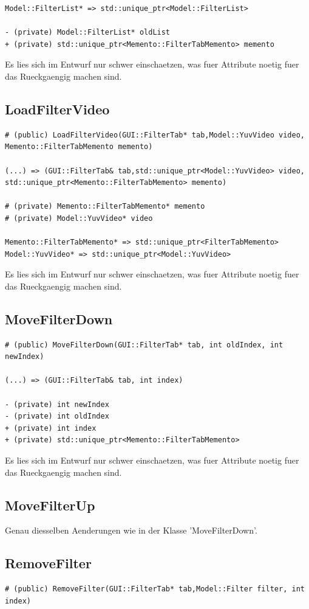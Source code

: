 \documentclass{scrartcl}
\begin{document}
{\begin{verbatim}
Model::FilterList* => std::unique_ptr<Model::FilterList>

- (private) Model::FilterList* oldList
+ (private) std::unique_ptr<Memento::FilterTabMemento> memento
\end{verbatim}
Es lies sich im Entwurf nur schwer einschaetzen, was fuer Attribute noetig fuer das Rueckgaengig machen sind.
\subsection{LoadFilterVideo}
\begin{verbatim}
# (public) LoadFilterVideo(GUI::FilterTab* tab,Model::YuvVideo video,
Memento::FilterTabMemento memento)

(...) => (GUI::FilterTab& tab,std::unique_ptr<Model::YuvVideo> video,
std::unique_ptr<Memento::FilterTabMemento> memento)

# (private) Memento::FilterTabMemento* memento
# (private) Model::YuvVideo* video

Memento::FilterTabMemento* => std::unique_ptr<FilterTabMemento>
Model::YuvVideo* => std::unique_ptr<Model::YuvVideo>
\end{verbatim}
Es lies sich im Entwurf nur schwer einschaetzen, was fuer Attribute noetig fuer das Rueckgaengig machen sind.
\subsection{MoveFilterDown}
\begin{verbatim}
# (public) MoveFilterDown(GUI::FilterTab* tab, int oldIndex, int newIndex)

(...) => (GUI::FilterTab& tab, int index)

- (private) int newIndex
- (private) int oldIndex
+ (private) int index
+ (private) std::unique_ptr<Memento::FilterTabMemento>
\end{verbatim}
Es lies sich im Entwurf nur schwer einschaetzen, was fuer Attribute noetig fuer das Rueckgaengig machen sind.
\subsection{MoveFilterUp}
Genau diesselben Aenderungen wie in der Klasse 'MoveFilterDown'.
\subsection{RemoveFilter}
\begin{verbatim}
# (public) RemoveFilter(GUI::FilterTab* tab,Model::Filter filter, int index)


\end{verbatim}}
\end{document}

